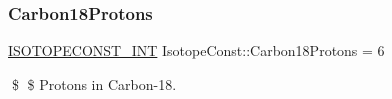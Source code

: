 \subsubsection{\texorpdfstring{Carbon18\+Protons}{Carbon18Protons}}
{\footnotesize\ttfamily \mbox{\hyperlink{group___isotope_const-_macros_ga5f18360b3e99483a35c32d789e62621c}{I\+S\+O\+T\+O\+P\+E\+C\+O\+N\+S\+T\+\_\+\+I\+NT}} Isotope\+Const\+::\+Carbon18\+Protons = 6}

\$ \$ Protons in Carbon-\/18. 
